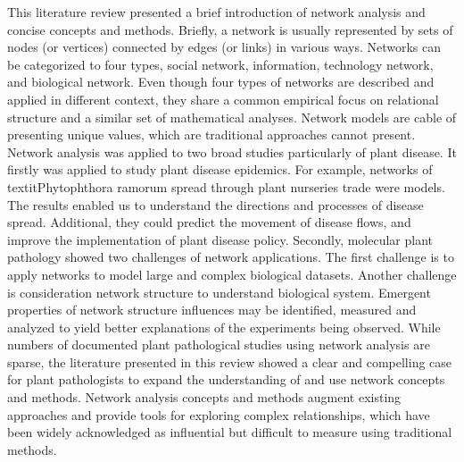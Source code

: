 This literature review presented a brief introduction of network analysis and concise concepts and methods. Briefly, a network is usually represented by sets of nodes (or vertices) connected by edges (or links) in various ways. Networks can be categorized to four types, social network, information, technology network, and biological network. Even though four types of networks are described and applied in different context, they share a common empirical focus on relational structure and a similar set of mathematical analyses. Network models are cable of presenting unique values, which are traditional approaches cannot present. Network analysis was applied to two broad studies particularly of plant disease. It firstly was applied to study plant disease epidemics. For example, networks of textit{Phytophthora ramorum} spread through plant nurseries trade were models. The results enabled us to understand the directions and processes of disease spread. Additional, they could predict the movement of disease flows, and improve the implementation of plant disease policy. Secondly, molecular plant pathology showed two challenges of network applications. The first challenge is to apply networks to model large and complex biological datasets. Another challenge is consideration network structure to understand biological system. Emergent properties of network structure influences may be identified, measured and analyzed to yield better explanations of the experiments being observed. While numbers of documented plant pathological studies using network analysis are sparse, the literature presented in this review showed a clear and compelling case for plant pathologists to expand the understanding of and use network concepts and methods. Network analysis concepts and methods augment existing approaches and provide tools for exploring complex relationships, which have been widely acknowledged as influential but difficult to measure using traditional methods. 

